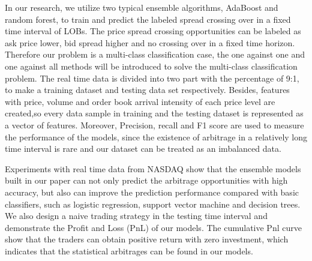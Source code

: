 In our research, we utilize two typical ensemble algorithms, AdaBoost and random forest, to train and predict the labeled spread crossing over in a fixed time interval of LOBs. The price spread crossing opportunities can be labeled as ask price lower, bid spread higher and no crossing over in a fixed time horizon. Therefore our problem is a multi-class classification case, the one against one and one against all methods will be introduced to solve the multi-class classification problem. The real time data is divided into two part with the percentage of 9:1, to make a training dataset and testing data set respectively. Besides, features with price, volume and order book arrival intensity of each price level are created,so every data sample in training and the testing dataset is represented as a vector of features. Moreover, Precision, recall and F1 score are used to measure the performance of the models, since the existence of arbitrage in a relatively long time interval is rare and our dataset can be treated as an imbalanced data.  

Experiments with real time data from NASDAQ show that the ensemble models built in our paper can not only predict the arbitrage opportunities with high accuracy, but also can improve the prediction performance compared with basic classifiers, such as logistic regression, support vector machine and decision trees. We also design a naive trading strategy in the testing time interval and demonstrate the Profit and Loss (PnL) of our models. The cumulative Pnl curve show that the traders can obtain positive return with zero investment, which indicates that the statistical arbitrages can be found in our models.

